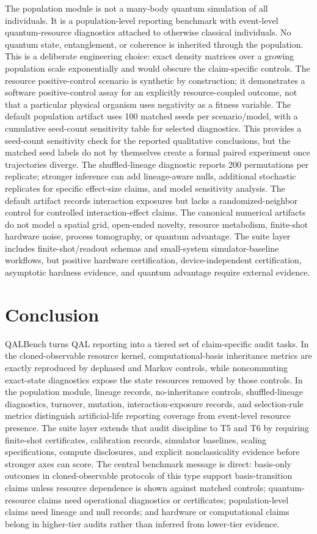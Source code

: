 \documentclass[11pt]{article}
\begin{document}
The population module is not a many-body quantum simulation of all individuals. It is a population-level reporting benchmark with event-level quantum-resource diagnostics attached to otherwise classical individuals. No quantum state, entanglement, or coherence is inherited through the population. This is a deliberate engineering choice: exact density matrices over a growing population scale exponentially and would obscure the claim-specific controls. The resource positive-control scenario is synthetic by construction; it demonstrates a software positive-control assay for an explicitly resource-coupled outcome, not that a particular physical organism uses negativity as a fitness variable. The default population artifact uses 100 matched seeds per scenario/model, with a cumulative seed-count sensitivity table for selected diagnostics. This provides a seed-count sensitivity check for the reported qualitative conclusions, but the matched seed labels do not by themselves create a formal paired experiment once trajectories diverge. The shuffled-lineage diagnostic reports 200 permutations per replicate; stronger inference can add lineage-aware nulls, additional stochastic replicates for specific effect-size claims, and model sensitivity analysis. The default artifact records interaction exposures but lacks a randomized-neighbor control for controlled interaction-effect claims. The canonical numerical artifacts do not model a spatial grid, open-ended novelty, resource metabolism, finite-shot hardware noise, process tomography, or quantum advantage. The suite layer includes finite-shot/readout schemas and small-system simulator-baseline workflows, but positive hardware certification, device-independent certification, asymptotic hardness evidence, and quantum advantage require external evidence.

\section{Conclusion}

QALBench turns QAL reporting into a tiered set of claim-specific audit tasks. In the cloned-observable resource kernel, computational-basis inheritance metrics are exactly reproduced by dephased and Markov controls, while noncommuting exact-state diagnostics expose the state resources removed by those controls. In the population module, lineage records, no-inheritance controls, shuffled-lineage diagnostics, turnover, mutation, interaction-exposure records, and selection-rule metrics distinguish artificial-life reporting coverage from event-level resource presence. The suite layer extends that audit discipline to T5 and T6 by requiring finite-shot certificates, calibration records, simulator baselines, scaling specifications, compute disclosures, and explicit nonclassicality evidence before stronger axes can score. The central benchmark message is direct: basis-only outcomes in cloned-observable protocols of this type support basis-transition claims unless resource dependence is shown against matched controls; quantum-resource claims need operational diagnostics or certificates; population-level claims need lineage and null records; and hardware or computational claims belong in higher-tier audits rather than inferred from lower-tier evidence.
\end{document}
